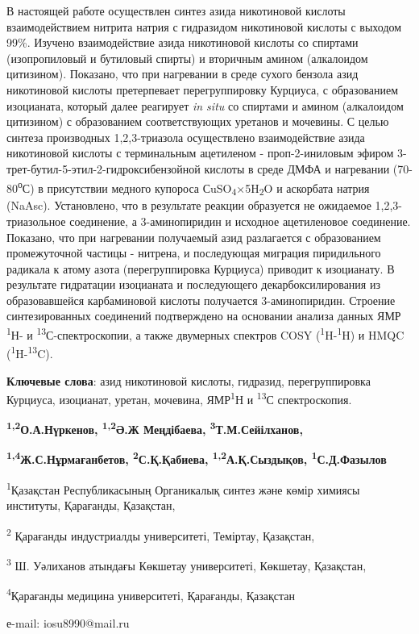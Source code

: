 В настоящей работе осуществлен синтез азида никотиновой кислоты
взаимодействием нитрита натрия с гидразидом никотиновой кислоты с
выходом 99\%. Изучено взаимодействие азида никотиновой кислоты со
спиртами (изопропиловый и бутиловый спирты) и вторичным амином
(алкалоидом цитизином). Показано, что при нагревании в среде сухого
бензола азид никотиновой кислоты претерпевает перегруппировку Курциуса,
с образованием изоцианата, который далее реагирует \emph{in situ} со
спиртами и амином (алкалоидом цитизином) с образованием соответствующих
уретанов и мочевины. С целью синтеза производных 1,2,3-триазола
осуществлено взаимодействие азида никотиновой кислоты с терминальным
ацетиленом - проп-2-иниловым эфиром
3-трет-бутил-5-этил-2-гидроксибензойной кислоты в среде ДМФА и
нагревании (70-80\textsuperscript{о}С) в присутствии медного купороса
СuSO\textsubscript{4}×5H\textsubscript{2}O и аскорбата натрия (NaAsc).
Установлено, что в результате реакции образуется не ожидаемое
1,2,3-триазольное соединение, а 3-аминопиридин и исходное ацетиленовое
соединение. Показано, что при нагревании получаемый азид разлагается с
образованием промежуточной частицы - нитрена, и последующая миграция
пиридильного радикала к атому азота (перегруппировка Курциуса) приводит
к изоцианату. В результате гидратации изоцианата и последующего
декарбоксилирования из образовавшейся карбаминовой кислоты получается
3-аминопиридин. Строение синтезированных соединений подтверждено на
основании анализа данных ЯМР \textsuperscript{1}Н- и
\textsuperscript{13}С-спектроскопии, а также двумерных спектров COSY
(\textsuperscript{1}H-\textsuperscript{1}H) и HMQC
(\textsuperscript{1}H-\textsuperscript{13}C).

{\bfseries Ключевые слова}: азид никотиновой кислоты, гидразид,
перегруппировка Курциуса, изоцианат, уретан, мочевина,
ЯМР\textsuperscript{1}Н и \textsuperscript{13}С спектроскопия.


\begin{center}
{\bfseries \textsuperscript{1,2}О.А.Нүркенов, \textsuperscript{1,2}Ә.Ж
Меңдібаева, \textsuperscript{3}Т.М.Сейілханов,}

{\bfseries \textsuperscript{1,4}Ж.С.Нұрмағанбетов,
\textsuperscript{2}С.Қ.Қабиева, \textsuperscript{1,2}А.Қ.Сыздықов,
\textsuperscript{1}С.Д.Фазылов}

\textsuperscript{1}Қазақстан Республикасының Органикалық синтез және
көмір химиясы институты, Қарағанды, Қазақстан,

\textsuperscript{2} Қарағанды индустриалды университеті, Теміртау,
Қазақстан,

\textsuperscript{3} Ш. Уәлиханов атындағы Көкшетау университеті,
Көкшетау, Қазақстан,

\textsuperscript{4}Қарағанды медицина университеті, Қарағанды, Қазақстан

е-mail: iosu8990@mail.ru
\end{center}

